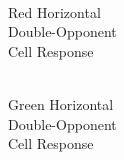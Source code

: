 \documentclass[journal,onecolumn]{IEEEtran}
\begin{document}
\begin{figure}[H]
\begin{subfigure}{0.15\textwidth}
        \caption{\\ Red Horizontal\\ Double-Opponent\\ Cell Response}
    \end{subfigure}
    \begin{subfigure}{0.15\textwidth}
        \centering
        \captionsetup{justification=centering}
        \caption{\\ Green Horizontal\\ Double-Opponent\\ Cell Response}
    \end{subfigure}
    \begin{subfigure}{0.15\textwidth}
        \centering
        \captionsetup{justification=centering}

\end{subfigure}
\end{figure}
\end{document}
